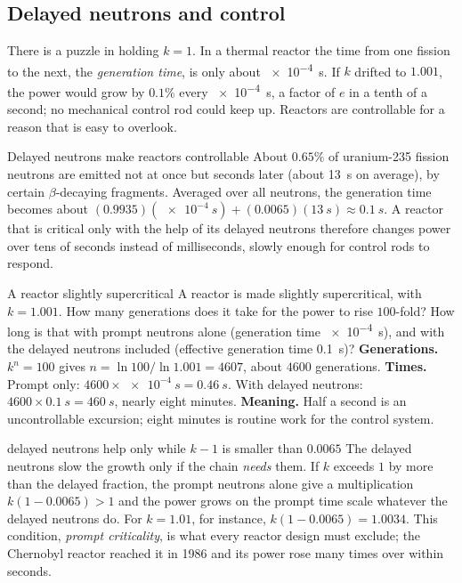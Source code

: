 \subsection{Delayed neutrons and control}

There is a puzzle in holding $k=1$. In a thermal reactor the time from one fission to the next, the
\emph{generation time}, is only about \SI{e-4}{s}. If $k$ drifted to $1.001$, the power would grow by
$0.1\%$ every \SI{e-4}{s}, a factor of $e$ in a tenth of a second; no mechanical control rod could keep up.
Reactors are controllable for a reason that is easy to overlook.

\begin{keybox}{Delayed neutrons make reactors controllable}
About $0.65\%$ of uranium-235 fission neutrons are emitted not at once but seconds later (about
\SI{13}{s} on average), by certain $\beta$-decaying fragments. Averaged over all neutrons, the generation
time becomes about $(0.9935)(\SI{e-4}{s})+(0.0065)(\SI{13}{s})\approx\SI{0.1}{s}$. A reactor that is
critical only with the help of its delayed neutrons therefore changes power over tens of seconds instead
of milliseconds, slowly enough for control rods to respond.
\end{keybox}

\begin{exbox}{A reactor slightly supercritical}\label{ex:react-supercritical}
A reactor is made slightly supercritical, with $k=1.001$. How many generations does it take for the power
to rise $100$-fold? How long is that with prompt neutrons alone (generation time \SI{e-4}{s}), and with
the delayed neutrons included (effective generation time \SI{0.1}{s})?
 \textbf{Generations.} $k^n=100$ gives $n=\ln100/\ln1.001=4607$, about $4600$ generations.
 \textbf{Times.} Prompt only: $4600\times\SI{e-4}{s}=\SI{0.46}{s}$. With delayed neutrons:
$4600\times\SI{0.1}{s}=\SI{460}{s}$, nearly eight minutes.
 \textbf{Meaning.} Half a second is an uncontrollable excursion; eight minutes is routine work
for the control system.
\end{exbox}

\begin{trapbox}{delayed neutrons help only while $k-1$ is smaller than $0.0065$}
The delayed neutrons slow the growth only if the chain \emph{needs} them. If $k$ exceeds $1$ by more than
the delayed fraction, the prompt neutrons alone give a multiplication $k(1-0.0065)>1$ and the power grows
on the prompt time scale whatever the delayed neutrons do. For $k=1.01$, for instance,
$k(1-0.0065)=1.0034$. This condition, \emph{prompt criticality}, is what every reactor design must exclude;
the Chernobyl reactor reached it in 1986 and its power rose many times over within seconds.
\end{trapbox}

